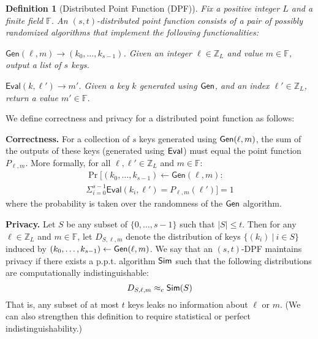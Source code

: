 \documentclass[10pt,twocolumn]{article}
\newtheorem{defn}{Definition}
\newcommand{\Z}{\mathbb{Z}}
\newcommand{\F}{\mathbb{F}}
\begin{document}
\begin{defn}[Distributed Point Function (DPF)]
Fix a positive integer $L$ and a finite field $\F$.
An {\em $(s,t)$-distributed point function} consists of a pair
of possibly randomized algorithms that implement the following functionalities:
\begin{compactitem}

\item
  $\mathsf{Gen}(\ell, m) \rightarrow (k_0, \dots, k_{s-1})$.
Given an integer $\ell \in \Z_L$ and value $m \in \F$, 
output a list of $s$ keys.

\item
$\mathsf{Eval}(k, \ell') \rightarrow m'$.
Given a key $k$ generated using ${\sf Gen}$, and 
an index $\ell' \in \Z_L$, return a value $m' \in \F$.
\end{compactitem}
\end{defn}

We define correctness and privacy for 
a distributed point function as follows:
\begin{compactitem}

\item
{\bf Correctness.}
For a collection of $s$ keys generated using ${\sf Gen}(\ell,m)$,
the sum of the outputs of these keys (generated using ${\sf Eval}$)
must equal the point function $P_{\ell,m}$.
More formally, for all $\ell, \ell' \in \Z_L$ and $m \in \F$:
\begin{multline*} 
\Pr[(k_0, \dots, k_{s-1}) \gets \mathsf{Gen}(\ell, m) :\\ 
    \Sigma_{i=0}^{s-1} \mathsf{Eval}(k_i, \ell') = P_{\ell,m}(\ell')] = 1 
\end{multline*}
where the probability is taken over the randomness of the ${\sf Gen}$ algorithm.

\item
{\bf Privacy.}
Let $S$ be any subset of $\{0, \dots, s-1\}$ 
such that $|S| \leq t$.
Then for any $\ell \in \Z_L$ and $m \in \F$,
let $D_{S,\ell,m}$ denote the distribution of
keys $\{ (k_i)\ |\ i \in S\}$ induced by 
$(k_0, \dots, k_{s-1}) \gets {\sf Gen}(\ell, m)$.
We say that an $(s,t)$-DPF maintains privacy if
there exists a p.p.t. algorithm ${\sf Sim}$ such that
the following distributions are computationally
indistinguishable:
\[ D_{S,\ell,m} \approx_c {\sf Sim}(S) \]
That is, any subset of at most
$t$ keys leaks no information about $\ell$ or $m$.
(We can also strengthen this definition to require statistical
or perfect indistinguishability.)
\end{compactitem}
\end{document}
